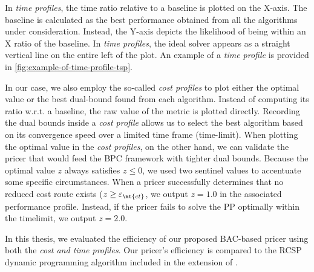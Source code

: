 In \textit{time profiles}, the time ratio relative to a baseline is plotted on the X-axis.
The baseline is calculated as the best performance obtained from all the algorithms under consideration.
Instead, the Y-axis depicts the likelihood of being within an X ratio of the baseline.
In \textit{time profiles}, the ideal solver appears as a straight vertical line on the entire left of the plot.
An example of a \textit{time profile} is provided in \cref{fig:example-of-time-profile-tsp}.

In our case, we also employ the so-called \textit{cost profiles} to plot either the optimal value
or the best dual-bound found from each algorithm.
Instead of computing its ratio w.r.t. a baseline, the raw value of the metric is plotted directly.
Recording the dual bounds inside a \textit{cost profile}
allows us to select the best algorithm
based on its convergence speed over a limited time frame (time-limit).
When plotting the optimal value in the \textit{cost profiles}, on the other hand,
we can validate the pricer that would feed the BPC framework with tighter dual bounds.
Because the optimal value $z$ always satisfies $z \le 0$,
we used two sentinel values to accentuate some specific circumstances.
When a pricer successfully determines that no reduced cost route exists
($z \ge \varepsilon_{\mt{ct}}$,
we output $z = 1.0$ in the associated performance profile.
Instead, if the pricer fails to solve the PP optimally within the timelimit,
we output $z = 2.0$.

\medskip

In this thesis, we evaluated the efficiency of our proposed BAC-based pricer
using both the \textit{cost and time profiles}.
Our pricer's efficiency is compared to the RCSP dynamic programming algorithm
included in the \vrpsolver{} extension \parencite{pessoa2020generic} of \bapcod{}.

